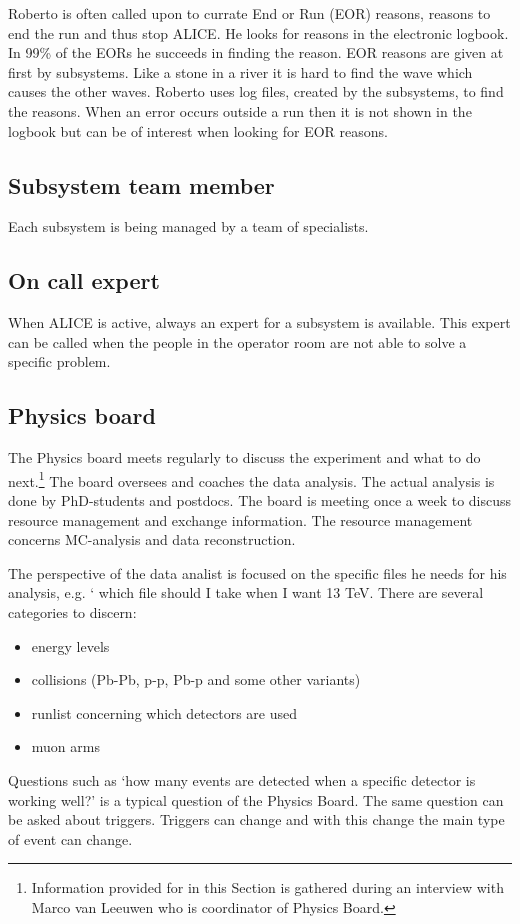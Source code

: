 Roberto is often called upon to currate End or Run (EOR) reasons, reasons to end the run and thus stop ALICE. He looks for reasons in the electronic logbook. In 99\% of the EORs he succeeds in finding the reason. EOR reasons are given at first by subsystems. Like a stone in a river it is hard to find the wave which causes the other waves. Roberto uses log files, created by the subsystems, to find the reasons. When an error occurs outside a run then it is not shown in the logbook but can be of interest when looking for EOR reasons. 

\subsection{Subsystem team member}
Each subsystem is being managed by a team of specialists. 

\subsection{On call expert}
When ALICE is active, always an expert for a subsystem is available. This expert can be called when the people in the operator room are not able to solve a specific problem.

\subsection{Physics board}
The Physics board meets regularly to discuss the experiment and what to do next.\footnote{Information provided for in this Section is gathered during an interview with Marco van Leeuwen who is coordinator of Physics Board.} The board oversees and coaches the data analysis. The actual analysis is done by PhD-students and postdocs. The board is meeting once a week to discuss resource management and exchange information. The resource management concerns MC-analysis and data reconstruction. 

The perspective of the data analist is focused on the specific files he needs for his analysis, e.g. ` which file should I take when I want 13 TeV. There are several categories to discern:
\begin{itemize}
  \item energy levels
  \item collisions (Pb-Pb, p-p, Pb-p and some other variants)
  \item runlist concerning which detectors are used
  \item muon arms
\end{itemize}
Questions such as `how many events are detected when a specific detector is working well?' is a typical question of the Physics Board. The same question can be asked about triggers. Triggers can change and with this change the main type of event can change.

